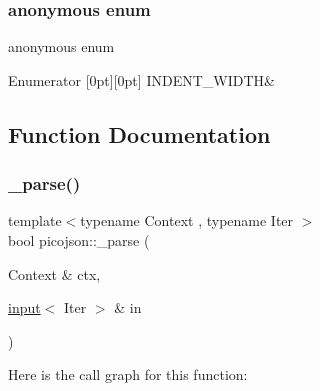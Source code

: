 \subsubsection{\texorpdfstring{anonymous enum}{anonymous enum}}
{\footnotesize\ttfamily anonymous enum}

\begin{DoxyEnumFields}{Enumerator}
[0pt][0pt]{}\hypertarget{namespacepicojson_ae3fd37cd4ad93e8b91a1dd552487eec4a2aee14a2b66d94b58c64c66edd8ed9b1}{}\label{namespacepicojson_ae3fd37cd4ad93e8b91a1dd552487eec4a2aee14a2b66d94b58c64c66edd8ed9b1} 
I\+N\+D\+E\+N\+T\+\_\+\+W\+I\+D\+TH&\\
\hline

\end{DoxyEnumFields}


\subsection{Function Documentation}
\hypertarget{namespacepicojson_aed024a6a1c8d8982a38c4a7fcefde221}{}\label{namespacepicojson_aed024a6a1c8d8982a38c4a7fcefde221} 
\subsubsection{\texorpdfstring{\+\_\+parse()}{\_parse()}\hspace{0.1cm}{\footnotesize\ttfamily [1/2]}}
{\footnotesize\ttfamily template$<$typename Context , typename Iter $>$ \\
bool picojson\+::\+\_\+parse (\begin{DoxyParamCaption}\item[{Context \&}]{ctx,  }\item[{\hyperlink{classpicojson_1_1input}{input}$<$ Iter $>$ \&}]{in }\end{DoxyParamCaption})\hspace{0.3cm}{\ttfamily [inline]}}

Here is the call graph for this function\+:
\hypertarget{namespacepicojson_a01c0a3f35d42282ba913375737c8e259}{}\label{namespacepicojson_a01c0a3f35d42282ba913375737c8e259} 
